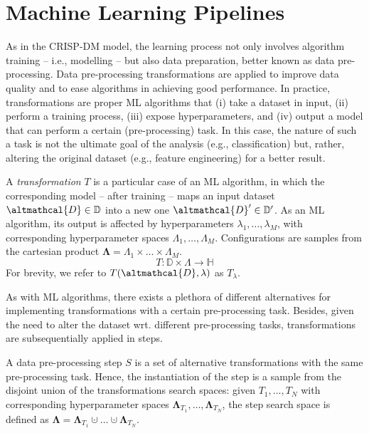 \section{Machine Learning Pipelines}
\label{automl-background-sec:pipelines}

As in the CRISP-DM model, the learning process not only involves algorithm training -- i.e., modelling -- but also data preparation, better known as data pre-processing.
Data pre-processing transformations are applied to improve data quality and to ease algorithms in achieving good performance.
In practice, transformations are proper ML algorithms that (i) take a dataset in input, (ii) perform a training process, (iii) expose hyperparameters, and (iv) output a model that can perform a certain (pre-processing) task.
In this case, the nature of such a task is not the ultimate goal of the analysis (e.g., classification) but, rather, altering the original dataset (e.g., feature engineering) for a better result.

\begin{definition}
   A \emph{transformation} $T$ is a particular case of an ML algorithm, in which the corresponding model -- after training -- maps an input dataset $\altmathcal{D} \in \mathbb{D}$ into a new one $\altmathcal{D}' \in \mathbb{D}'$.
    As an ML algorithm, its output is affected by hyperparameters $\lambda_1, \dots, \lambda_M$, with corresponding hyperparameter spaces $\Lambda_1, \dots, \Lambda_M$.
    Configurations are samples from the cartesian product $\pmb{\Lambda} = \Lambda_1 \times \ldots \times \Lambda_M$.
    \begin{equation*}
        T: \mathbb{D} \times \Lambda \rightarrow \mathbb{H}
    \end{equation*}
    For brevity, we refer to $T(\altmathcal{D}, \lambda)$ as $T_{\lambda}$.
\end{definition}

As with ML algorithms, there exists a plethora of different alternatives for implementing transformations with a certain pre-processing task.
Besides, given the need to alter the dataset wrt. different pre-processing tasks, transformations are subsequentially applied in steps.

\begin{definition}
    A data pre-processing step $S$ is a set of alternative transformations with the same pre-processing task.
    Hence, the instantiation of the step is a sample from the disjoint union of the transformations search spaces: given $T_1, \dots, T_N$ with corresponding hyperparameter spaces $\pmb{\Lambda}_{T_1}, \dots, \pmb{\Lambda}_{T_N}$, the step search space is defined as  $\pmb{\Lambda}  = \pmb{\Lambda}_{T_1} \cupdot \dots \cupdot \pmb{\Lambda}_{T_N}$.
\end{definition}

